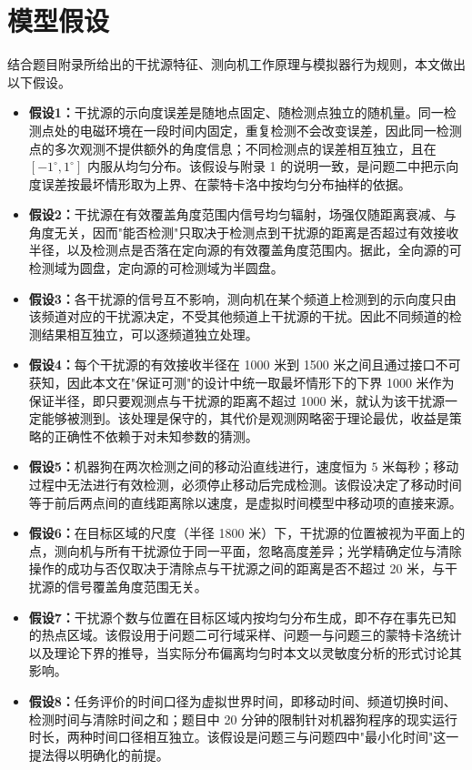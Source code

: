 
\section{模型假设}

结合题目附录所给出的干扰源特征、测向机工作原理与模拟器行为规则，本文做出以下假设。

\begin{itemize}[itemindent=2em]
\item \textbf{假设1：}干扰源的示向度误差是随地点固定、随检测点独立的随机量。同一检测点处的电磁环境在一段时间内固定，重复检测不会改变误差，因此同一检测点的多次观测不提供额外的角度信息；不同检测点的误差相互独立，且在 $[-1^\circ,1^\circ]$ 内服从均匀分布。该假设与附录 1 的说明一致，是问题二中把示向度误差按最坏情形取为上界、在蒙特卡洛中按均匀分布抽样的依据。
\item \textbf{假设2：}干扰源在有效覆盖角度范围内信号均匀辐射，场强仅随距离衰减、与角度无关，因而"能否检测"只取决于检测点到干扰源的距离是否超过有效接收半径，以及检测点是否落在定向源的有效覆盖角度范围内。据此，全向源的可检测域为圆盘，定向源的可检测域为半圆盘。
\item \textbf{假设3：}各干扰源的信号互不影响，测向机在某个频道上检测到的示向度只由该频道对应的干扰源决定，不受其他频道上干扰源的干扰。因此不同频道的检测结果相互独立，可以逐频道独立处理。
\item \textbf{假设4：}每个干扰源的有效接收半径在 1000 米到 1500 米之间且通过接口不可获知，因此本文在"保证可测"的设计中统一取最坏情形下的下界 1000 米作为保证半径，即只要观测点与干扰源的距离不超过 1000 米，就认为该干扰源一定能够被测到。该处理是保守的，其代价是观测网略密于理论最优，收益是策略的正确性不依赖于对未知参数的猜测。
\item \textbf{假设5：}机器狗在两次检测之间的移动沿直线进行，速度恒为 $5$ 米每秒；移动过程中无法进行有效检测，必须停止移动后完成检测。该假设决定了移动时间等于前后两点间的直线距离除以速度，是虚拟时间模型中移动项的直接来源。
\item \textbf{假设6：}在目标区域的尺度（半径 1800 米）下，干扰源的位置被视为平面上的点，测向机与所有干扰源位于同一平面，忽略高度差异；光学精确定位与清除操作的成功与否仅取决于清除点与干扰源之间的距离是否不超过 20 米，与干扰源的信号覆盖角度范围无关。
\item \textbf{假设7：}干扰源个数与位置在目标区域内按均匀分布生成，即不存在事先已知的热点区域。该假设用于问题二可行域采样、问题一与问题三的蒙特卡洛统计以及理论下界的推导，当实际分布偏离均匀时本文以灵敏度分析的形式讨论其影响。
\item \textbf{假设8：}任务评价的时间口径为虚拟世界时间，即移动时间、频道切换时间、检测时间与清除时间之和；题目中 20 分钟的限制针对机器狗程序的现实运行时长，两种时间口径相互独立。该假设是问题三与问题四中"最小化时间"这一提法得以明确化的前提。
\end{itemize}
